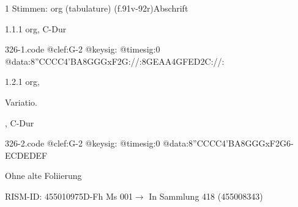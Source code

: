 \documentclass[twocolumn]{book}
\begin{document}
\par \textcolor{darkblue}{}  1 Stimmen: org (tabulature)  (f.91v-92r)\newline Abschrift
\par 1.1.1  org, C-Dur  
\begin{filecontents*}{326-1.code}
@clef:G-2
@keysig:
@timesig:0
@data:8''CCCC4'BA8GGGxF2G://:8GEAA4GFED2C://:
\end{filecontents*}
\newline
%
\par 1.2.1  org, \begin{itshape}Variatio.\end{itshape}, C-Dur  
\begin{filecontents*}{326-2.code}
@clef:G-2
@keysig:
@timesig:0
@data:8''CCCC4'BA8GGGxF2G6-{ECD}{EDEF}
\end{filecontents*}
\newline
%
\par Ohne alte Foliierung
\par RISM-ID: 455010975\newline D-Fh  Ms 001\newline $\rightarrow$ In Sammlung 418 (455008343)
      
\end{document}
